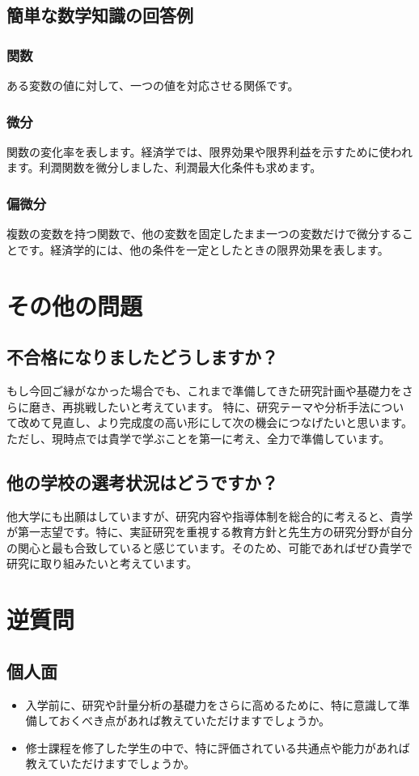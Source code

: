\documentclass[xelatex,a4paper,base=11pt,ja=standard,jafont=noto]{bxjsreport}
\begin{document}
\section{簡単な数学知識の回答例}
\subsection*{関数}
ある変数の値に対して、一つの値を対応させる関係です。
\subsection*{微分}
関数の変化率を表します。経済学では、限界効果や限界利益を示すために使われます。利潤関数を微分しました、利潤最大化条件も求めます。
\subsection*{偏微分}
複数の変数を持つ関数で、他の変数を固定したまま一つの変数だけで微分することです。経済学的には、他の条件を一定としたときの限界効果を表します。
\chapter{その他の問題}
\section{不合格になりましたどうしますか？}
もし今回ご縁がなかった場合でも、これまで準備してきた研究計画や基礎力をさらに磨き、再挑戦したいと考えています。
特に、研究テーマや分析手法について改めて見直し、より完成度の高い形にして次の機会につなげたいと思います。
ただし、現時点では貴学で学ぶことを第一に考え、全力で準備しています。
\section{他の学校の選考状況はどうですか？}
他大学にも出願はしていますが、研究内容や指導体制を総合的に考えると、貴学が第一志望です。特に、実証研究を重視する教育方針と先生方の研究分野が自分の関心と最も合致していると感じています。そのため、可能であればぜひ貴学で研究に取り組みたいと考えています。

\chapter{逆質問}
\section{個人面}
\begin{itemize}
    \item 入学前に、研究や計量分析の基礎力をさらに高めるために、特に意識して準備しておくべき点があれば教えていただけますでしょうか。
    \item 修士課程を修了した学生の中で、特に評価されている共通点や能力があれば教えていただけますでしょうか。
\end{itemize}
\end{document}
